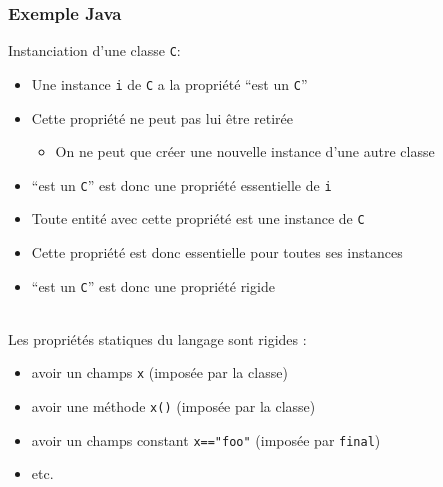 \documentclass[draft]{beamer}
\begin{document}
\begin{frame}
\frametitle{Exemple Java}
\def\instance{\lstinline{i}\xspace}
\def\class{\lstinline{C}\xspace}
\def\prop{``est un \class''\xspace}
Instanciation d'une classe \class :
\begin{itemize}
 \item Une instance \instance de \class a la propriété \prop
 \item Cette propriété ne peut pas lui être retirée
 \begin{itemize}
  \item On ne peut que créer une nouvelle instance d'une autre classe
 \end{itemize}
 \item \prop est donc une propriété essentielle de \instance
 \item Toute entité avec cette propriété est une instance de \class
 \item Cette propriété est donc essentielle pour toutes ses instances
 \item \prop est donc une propriété rigide
\end{itemize}
~\\
Les propriétés statiques du langage sont rigides :
\begin{itemize}
 \item avoir un champs \lstinline{x} (imposée par la classe)
 \item avoir une méthode \lstinline{x()} (imposée par la classe)
 \item avoir un champs constant \lstinline{x=="foo"} (imposée par \lstinline{final})
 \item etc.
\end{itemize}
\end{frame}
\end{document}
